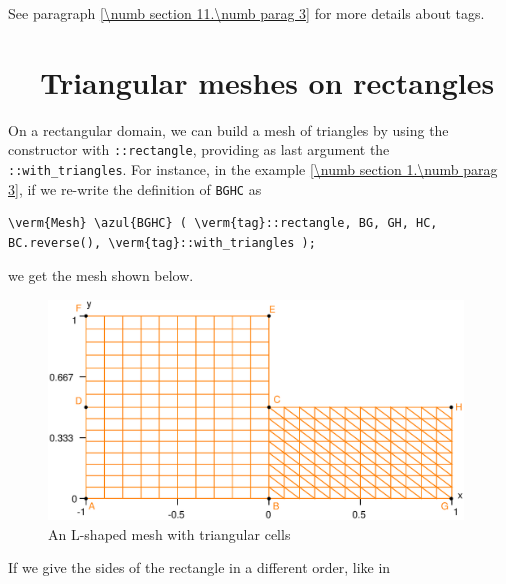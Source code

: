 See paragraph \ref{\numb section 11.\numb parag 3} for more details about tags.


\section{~~Triangular meshes on rectangles}\label{\numb section 2.\numb parag 2}

On a rectangular domain, we can build a mesh of triangles by using the {\small\tt {}}
constructor with {\small\tt {}::rectangle}, providing as last argument the
{\small\tt {}::with\_triangles}.
For instance, in the example \ref{\numb section 1.\numb parag 3},
if we re-write the definition of {\small\tt BGHC} as

\begin{Verbatim}[commandchars=\\\{\},formatcom=\small\tt,baselinestretch=0.94]
   \verm{Mesh} \azul{BGHC} ( \verm{tag}::rectangle, BG, GH, HC, BC.reverse(), \verm{tag}::with_triangles );
\end{Verbatim}

\noindent we get the mesh shown below.

\begin{figure}[ht] \centering
  \includegraphics[width=110mm]{L-shaped-tri}
  \caption{An L-shaped mesh with triangular cells}
  \label{\numb section 2.\numb fig 2}
\end{figure}

If we give the sides of the rectangle in a different order, like in

